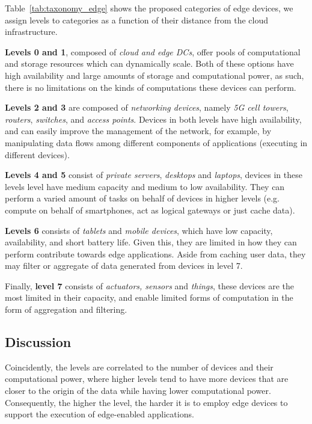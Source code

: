 Table~\ref{tab:taxonomy_edge} shows the proposed categories of edge devices, we assign levels to categories as a function of their distance from the cloud infrastructure. 

\textbf{Levels 0 and 1}, composed of \textit{cloud and edge DCs}, offer pools of computational and storage resources which can dynamically scale. Both of these options have high availability and large amounts of storage and computational power, as such, there is no limitations on the kinds of computations these devices can perform.

\textbf{Levels 2 and 3} are composed of \textit{networking devices}, namely 
\textit{5G cell towers}, \textit{routers}, \textit{switches}, and \textit{access points}. Devices in both levels have high availability, and can easily improve the management of the network, for example, by manipulating data flows among different components of applications (executing in different devices).

\textbf{Levels 4 and  5} consist of \textit{private servers}, \textit{desktops} and \textit{laptops}, devices in these levels level have medium capacity and medium to low availability. They can perform a varied amount of tasks on behalf of devices in higher levels (e.g. compute on behalf of smartphones, act as logical gateways or just cache data). 

\textbf{Levels 6} consists of \textit{tablets} and \textit{mobile devices}, which have low capacity, availability, and short battery life. Given this, they are limited in how they can perform contribute towards edge applications. Aside from caching user data, they may filter or aggregate of data generated from devices in level 7.

Finally, \textbf{level 7} consists of \textit{actuators, sensors} and \textit{things}, these devices are the most limited in their capacity, and enable limited forms of computation in the form of aggregation and filtering.

\subsection{Discussion}

Coincidently, the levels are correlated to the number of devices and their computational power, where higher levels tend to have more devices that are closer to the origin of the data while having lower computational power. Consequently, the higher the level, the harder it is to employ edge devices to support the execution of edge-enabled applications. 

